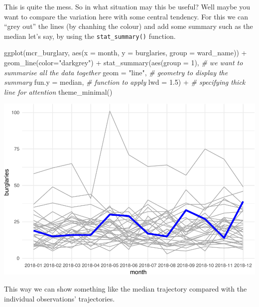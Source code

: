 \documentclass[
  krantz2]{krantz}
\makeatletter
\newenvironment{Shaded}{\begin{snugshade}}{\end{snugshade}}
\newcommand{\AttributeTok}[1]{\textcolor[rgb]{0.61,0.61,0.61}{#1}}
\newcommand{\CommentTok}[1]{\textcolor[rgb]{0.37,0.37,0.37}{\textit{#1}}}
\newcommand{\DecValTok}[1]{\textcolor[rgb]{0.06,0.06,0.06}{#1}}
\newcommand{\FloatTok}[1]{\textcolor[rgb]{0.06,0.06,0.06}{#1}}
\newcommand{\FunctionTok}[1]{\textcolor[rgb]{0,0,0}{#1}}
\newcommand{\NormalTok}[1]{#1}
\newcommand{\SpecialCharTok}[1]{\textcolor[rgb]{0,0,0}{#1}}
\newcommand{\StringTok}[1]{\textcolor[rgb]{0.5,0.5,0.5}{#1}}
\newenvironment{kframe}{%
\medskip{}
\setlength{\fboxsep}{.8em}
 \def\at@end@of@kframe{}%
 \ifinner\ifhmode%
  \def\at@end@of@kframe{\end{minipage}}%
  \begin{minipage}{\columnwidth}%
 \fi\fi%
 \def\FrameCommand##1{\hskip\@totalleftmargin \hskip-\fboxsep
 \colorbox{shadecolor}{##1}\hskip-\fboxsep
     \hskip-\linewidth \hskip-\@totalleftmargin \hskip\columnwidth}%
 \MakeFramed {\advance\hsize-\width
   \@totalleftmargin\z@ \linewidth\hsize
   \@setminipage}}%
 {\par\unskip\endMakeFramed%
 \at@end@of@kframe}
\renewenvironment{Shaded}{\begin{kframe}}{\end{kframe}}
\makeatother
\begin{document}
This is quite the mess. So in what situation may this be useful? Well maybe you want to compare the variation here with some central tendency. For this we can ``grey out'' the lines (by chanhing the colour) and add some summary such as the median let's say, by using the \texttt{stat\_summary()} function.

\begin{Shaded}
\begin{Highlighting}[]
\FunctionTok{ggplot}\NormalTok{(mcr\_burglary, }
       \FunctionTok{aes}\NormalTok{(}\AttributeTok{x =}\NormalTok{ month, }
           \AttributeTok{y =}\NormalTok{ burglaries, }
           \AttributeTok{group =}\NormalTok{ ward\_name)) }\SpecialCharTok{+} 
  \FunctionTok{geom\_line}\NormalTok{(}\AttributeTok{color=}\StringTok{"darkgrey"}\NormalTok{) }\SpecialCharTok{+} 
  \FunctionTok{stat\_summary}\NormalTok{(}\FunctionTok{aes}\NormalTok{(}\AttributeTok{group =} \DecValTok{1}\NormalTok{), }\CommentTok{\# we want to summarise all the data together}
               \AttributeTok{geom =} \StringTok{"line"}\NormalTok{,  }\CommentTok{\# geometry to display the summary }
               \AttributeTok{fun.y =}\NormalTok{ median, }\CommentTok{\# function to apply}
              \AttributeTok{lwd =} \FloatTok{1.5}\NormalTok{) }\SpecialCharTok{+}   \CommentTok{\# specifying thick line for attention}
  \FunctionTok{theme\_minimal}\NormalTok{()}
\end{Highlighting}
\end{Shaded}

\includegraphics{crime_mapping_files/figure-latex/unnamed-chunk-183-1.pdf}

This way we can show something like the median trajectory compared with the individual observations' trajectories.
\end{document}
